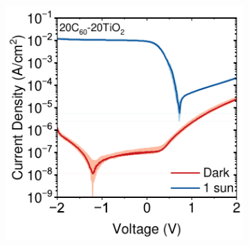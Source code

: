\begin{figure}[!ht]
\begin{subfigure}[b]{0.32\textwidth}
        \caption{}
    \end{subfigure}
    \hfill
    \begin{subfigure}[b]{0.32\textwidth}
        \centering
        \includegraphics[width=\textwidth]{chapters/transport_layers/images/JV_Median_20_20.pdf}
        \caption{}
    \end{subfigure}



\end{figure}
